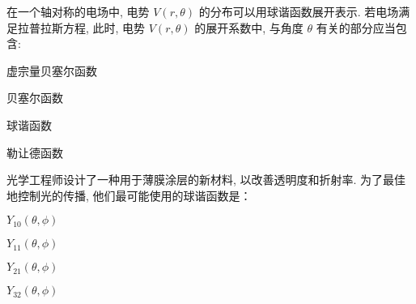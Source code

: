 \documentclass{njustexam}
\begin{document}
\begin{problem}
  在一个轴对称的电场中, 电势 $V(r,  \theta)$ 的分布可以用球谐函数展开表示. 
  若电场满足拉普拉斯方程, 
  此时, 电势 $V(r,  \theta)$ 的展开系数中, 与角度 $\theta$ 有关的部分应当包含: 
  \begin{abcd}
  \item 虚宗量贝塞尔函数
  \item 贝塞尔函数 
  \item 球谐函数 
  \item 勒让德函数
  \end{abcd}
\end{problem}



  
  
  

  \begin{problem}
    光学工程师设计了一种用于薄膜涂层的新材料, 以改善透明度和折射率. 为了最佳地控制光的传播, 他们最可能使用的球谐函数是：
    \begin{abcd}

    \item $Y_{10}(\theta,  \phi)$
    
    \item $Y_{11}(\theta,  \phi)$
    
    \item $Y_{21}(\theta,  \phi)$
    
    \item $Y_{32}(\theta,  \phi)$
   \end{abcd}

  \end{problem}
\end{document}
